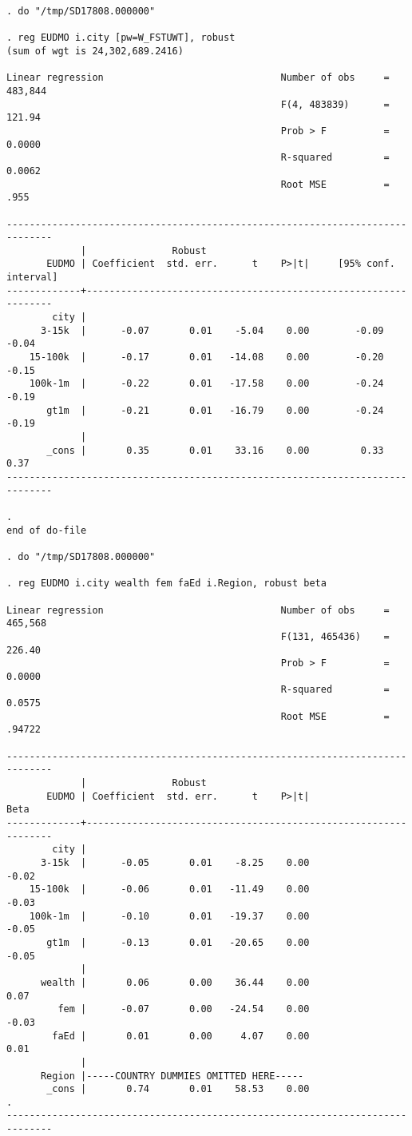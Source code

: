 \documentclass[10pt, letterpaper]{article}
\begin{document}
\begin{spacing}{1.4}
\begin{spacing}{.5}
\begin{scriptsize}
\begin{verbatim}
. do "/tmp/SD17808.000000"

. reg EUDMO i.city [pw=W_FSTUWT], robust  
(sum of wgt is 24,302,689.2416)

Linear regression                               Number of obs     =    483,844
                                                F(4, 483839)      =     121.94
                                                Prob > F          =     0.0000
                                                R-squared         =     0.0062
                                                Root MSE          =       .955

------------------------------------------------------------------------------
             |               Robust
       EUDMO | Coefficient  std. err.      t    P>|t|     [95% conf. interval]
-------------+----------------------------------------------------------------
        city |
      3-15k  |      -0.07       0.01    -5.04    0.00        -0.09       -0.04
    15-100k  |      -0.17       0.01   -14.08    0.00        -0.20       -0.15
    100k-1m  |      -0.22       0.01   -17.58    0.00        -0.24       -0.19
       gt1m  |      -0.21       0.01   -16.79    0.00        -0.24       -0.19
             |
       _cons |       0.35       0.01    33.16    0.00         0.33        0.37
------------------------------------------------------------------------------

. 
end of do-file

. do "/tmp/SD17808.000000"

. reg EUDMO i.city wealth fem faEd i.Region, robust beta 

Linear regression                               Number of obs     =    465,568
                                                F(131, 465436)    =     226.40
                                                Prob > F          =     0.0000
                                                R-squared         =     0.0575
                                                Root MSE          =     .94722

------------------------------------------------------------------------------
             |               Robust
       EUDMO | Coefficient  std. err.      t    P>|t|                     Beta
-------------+----------------------------------------------------------------
        city |
      3-15k  |      -0.05       0.01    -8.25    0.00                    -0.02
    15-100k  |      -0.06       0.01   -11.49    0.00                    -0.03
    100k-1m  |      -0.10       0.01   -19.37    0.00                    -0.05
       gt1m  |      -0.13       0.01   -20.65    0.00                    -0.05
             |
      wealth |       0.06       0.00    36.44    0.00                     0.07
         fem |      -0.07       0.00   -24.54    0.00                    -0.03
        faEd |       0.01       0.00     4.07    0.00                     0.01
             |
      Region |-----COUNTRY DUMMIES OMITTED HERE-----
       _cons |       0.74       0.01    58.53    0.00                        .
------------------------------------------------------------------------------


\end{verbatim}
\end{scriptsize}
\end{spacing}
\end{spacing}
\end{document}
